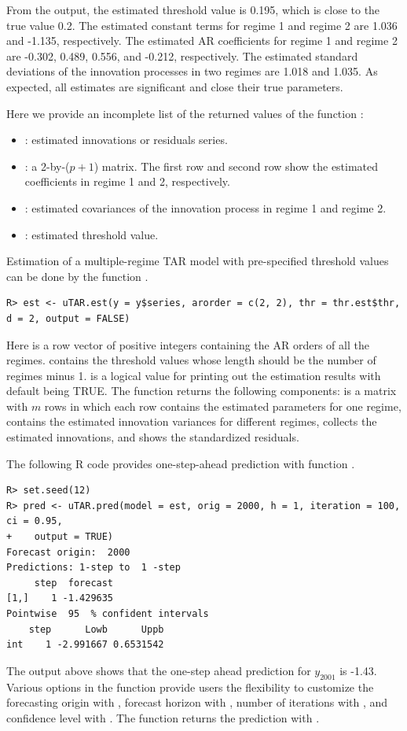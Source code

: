 From the output, the estimated threshold value is 0.195, which is close to the true value 0.2. The estimated constant terms for regime 1 and regime 2 are 1.036 and -1.135, respectively.
The estimated AR coefficients for regime 1 and regime 2 are -0.302, 0.489, 0.556, and -0.212,
respectively.  The estimated standard deviations of the innovation processes in two regimes
are 1.018 and 1.035. As expected, all estimates are significant and close their true parameters.


Here we provide an incomplete list of the returned values of the function :
\begin{itemize}\setlength\itemsep{-0.3em}
\item {}: estimated innovations or residuals series.
\item {}: a 2-by-($p+1$) matrix. The first row and second row show the estimated
coefficients in regime 1 and 2, respectively.
\item {}: estimated covariances of the innovation process in regime 1 and regime 2.
\item {}: estimated threshold value.
\end{itemize}




Estimation of a multiple-regime TAR model with pre-specified threshold values  can be done by the
function . 
\begin{verbatim}
R> est <- uTAR.est(y = y$series, arorder = c(2, 2), thr = thr.est$thr, d = 2, output = FALSE)
\end{verbatim}
Here  is a row vector of positive integers containing the AR orders of all the regimes.  contains the threshold values whose length should be the number of regimes minus 1.  is a logical value for printing out the estimation results with default being TRUE. The function  returns the following components:  is a matrix with $m$ rows in which each row contains the estimated parameters for one regime,  contains the estimated innovation variances for different regimes,  collects the estimated innovations, and  shows the standardized residuals.



The following {R} code provides one-step-ahead prediction with function .
\begin{verbatim}
R> set.seed(12)
R> pred <- uTAR.pred(model = est, orig = 2000, h = 1, iteration = 100, ci = 0.95,
+    output = TRUE)
Forecast origin:  2000 
Predictions: 1-step to  1 -step 
     step  forecast
[1,]    1 -1.429635
Pointwise  95  % confident intervals 
    step      Lowb      Uppb
int    1 -2.991667 0.6531542
\end{verbatim}
The output above shows that the one-step ahead prediction for $y_{2001}$ is -1.43. Various options in the function  provide users the flexibility to customize the forecasting origin with , forecast horizon with , number of iterations with , and confidence level with . The function  returns the prediction with . 


